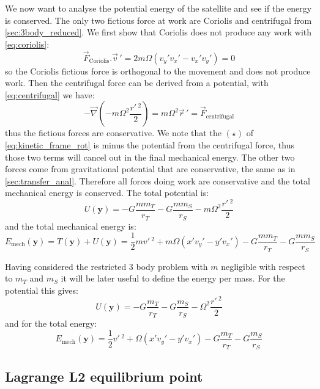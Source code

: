 We now want to analyse the potential energy of the satellite and see if the energy is conserved. The only two fictious force at work are Coriolis and centrifugal from \autoref{sec:3body_reduced}. We first show that Coriolis does not produce any work with \autoref{eq:coriolis}:
\begin{equation}
    \vec{F}_\mathrm{Coriolis}.\vec{v}\,' = 2m\Omega(v_y'v_x' - v_x'v_y') = 0
\end{equation}
so the Coriolis fictious force is orthogonal to the movement and does not produce work. Then the centrifugal force can be derived from a potential, with \autoref{eq:centrifugal} we have:
\begin{equation}
    - \vec{\nabla} (-m\Omega^2 \frac{r'\,^2}{2}) = m \Omega^2 \vec{r}\,' = \vec{F}_\mathrm{centrifugal}
\end{equation}
thus the fictious forces are conservative. We note that the $(\star)$ of \autoref{eq:kinetic_frame_rot} is minus the potential from the centrifugal force, thus those two terms will cancel out in the final mechanical energy. The other two forces come from gravitational potential that are conservative, the same as in \autoref{sec:transfer_anal}. Therefore all forces doing work are conservative and the total mechanical energy is conserved. The total potential is:
\begin{equation}
    U(\mathbf{y}) = - G \frac{mm_T}{r_T} - G \frac{mm_S}{r_S} - m\Omega^2 \frac{r'\,^2}{2}
\end{equation}
and the total mechanical energy is:
\begin{equation}
    E_\mathrm{mech}(\mathbf{y}) = T(\mathbf{y}) + U(\mathbf{y}) = \frac{1}{2}mv'\,^2 + m\Omega(x'v_y' - y'v_x') - G \frac{mm_T}{r_T} - G \frac{mm_S}{r_S}
\end{equation}

Having considered the restricted 3 body problem with $m$ negligible with respect to $m_T$ and $m_S$ it will be later useful to define the energy per mass. For the potential this gives:
\begin{equation}
    U(\mathbf{y}) = - G \frac{m_T}{r_T} - G \frac{m_S}{r_S} - \Omega^2 \frac{r'\,^2}{2}
    \label{eq:pot_per_mass}
\end{equation}
and for the total energy:
\begin{equation}
    E_\mathrm{mech}(\mathbf{y}) = \frac{1}{2}v'\,^2 + \Omega(x'v_y' - y'v_x') - G \frac{m_T}{r_T} - G \frac{m_S}{r_S}
\end{equation}


\subsection{Lagrange L2 equilibrium point}
\label{sec:lagrange_L2}

